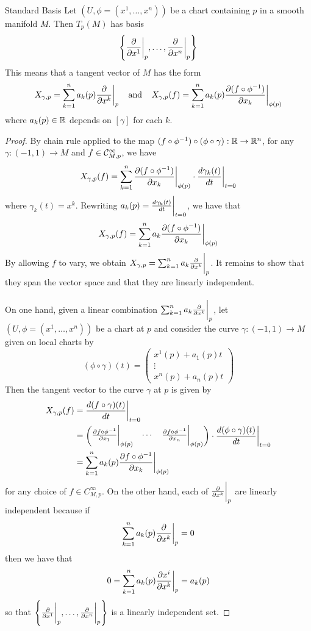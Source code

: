 \documentclass[a4paper]{article}
\begin{document}
\begin{prp}{Standard Basis}{} Let $(U,\phi=(x^1,\dots,x^n))$ be a chart containing $p$ in a smooth manifold $M$. Then $T_p(M)$ has basis $$\left\{\frac{\partial}{\partial x^1}\bigg\vert_p,\dots,\frac{\partial}{\partial x^n}\bigg{|}_p\right\}$$ This means that a tangent vector of $M$ has the form $$X_{\gamma,p}=\sum_{k=1}^na_k(p)\frac{\partial}{\partial x^k}\bigg{|}_p\;\;\;\;\text{and}\;\;\;\;X_{\gamma,p}(f)=\sum_{k=1}^na_k(p)\frac{\partial (f\circ\phi^{-1})}{\partial x_k}\bigg{|}_{\phi(p)}$$ where $a_k(p)\in\mathbb{R}$ depends on $[\gamma]$ for each $k$. \tcbline
\begin{proof}
By chain rule applied to the map $(f\circ\phi^{-1})\circ(\phi\circ\gamma):\mathbb{R}\to\mathbb{R}^n$, for any $\gamma:(-1,1)\to M$ and $f\in\mathcal{C}_{M,p}^\infty$, we have $$X_{\gamma,p}(f)=\sum_{k=1}^n\frac{\partial (f\circ\phi^{-1})}{\partial x_k}\bigg{|}_{\phi(p)}\cdot\frac{d\gamma_k(t)}{dt}\bigg{|}_{t=0}$$ where $\gamma_k(t)=x^k$. Rewriting $a_k(p)=\frac{d\gamma_k(t)}{dt}\bigg{|}_{t=0}$, we have that $$X_{\gamma,p}(f)=\sum_{k=1}^na_k\frac{\partial (f\circ\phi^{-1})}{\partial x_k}\bigg{|}_{\phi(p)}$$ By allowing $f$ to vary, we obtain $X_{\gamma,p}=\sum_{k=1}^na_k\frac{\partial}{\partial x^k}\bigg{|}_p$. It remains to show that they span the vector space and that they are linearly independent. \\~\\

On one hand, given a linear combination $\sum_{k=1}^na_k\frac{\partial}{\partial x^k}\bigg{|}_p$, let $(U,\phi=(x^1,\dots,x^n))$ be a chart at $p$ and consider the curve $\gamma:(-1,1)\to M$ given on local charts by $$(\phi\circ\gamma)(t)=\begin{pmatrix}
x^1(p)+a_1(p)t\\
\vdots\\
x^n(p)+a_n(p)t
\end{pmatrix}$$ Then the tangent vector to the curve $\gamma$ at $p$ is given by 
\begin{align*}
X_{\gamma,p}(f)&=\frac{d(f\circ\gamma)(t)}{dt}\bigg{|}_{t=0}\\
&=\begin{pmatrix}
\frac{\partial f\circ\phi^{-1}}{\partial x_1}\bigg{|}_{\phi(p)} & \cdots & \frac{\partial f\circ\phi^{-1}}{\partial x_n}\bigg{|}_{\phi(p)}
\end{pmatrix}\cdot\frac{d(\phi\circ\gamma)(t)}{dt}\bigg{|}_{t=0}\\
&=\sum_{k=1}^na_k(p)\frac{\partial f\circ\phi^{-1}}{\partial x_k}\bigg{|}_{\phi(p)}
\end{align*} for any choice of $f\in C_{M,p}^\infty$. On the other hand, each of $\frac{\partial}{\partial x^k}\bigg{|}_p$ are linearly independent because if $$\sum_{k=1}^na_k(p)\frac{\partial}{\partial x^k}\bigg{|}_p=0$$ then we have that $$0=\sum_{k=1}^na_k(p)\frac{\partial x^i}{\partial x^k}\bigg{|}_p=a_k(p)$$ so that $\left\{\frac{\partial}{\partial x^1}\bigg\vert_p,\dots,\frac{\partial}{\partial x^n}\bigg{|}_p\right\}$ is a linearly independent set. 
\end{proof}
\end{prp}
\end{document}
